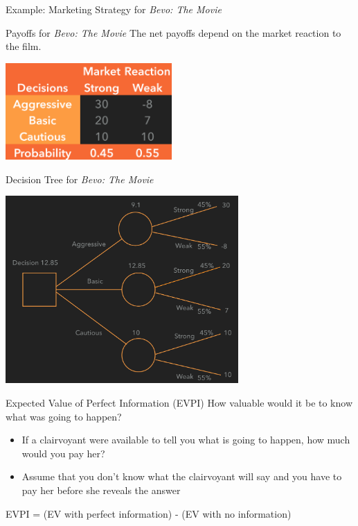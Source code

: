 \documentclass{beamer}\usepackage[]{graphicx}\usepackage[]{color}
\begin{document}
\begin{darkframes}
\begin{frame}[fragile]{Example: Marketing Strategy for \emph{Bevo: The Movie}}
    \end{frame}



    \begin{frame}[fragile]{Payoffs for \emph{Bevo: The Movie}}
      The net payoffs depend on the market reaction to the film.

        \begin{center}
          \includegraphics[width=2.5in]{BevoPayoffs} 
        \end{center}
  
    \end{frame}


    \begin{frame}[fragile]{Decision Tree for \emph{Bevo: The Movie}}

        \begin{center}
          \includegraphics[width=3.5in]{BevoDecisionTree} 
        \end{center}

      \lc %
    \end{frame}


    \begin{frame}[fragile]{Expected Value of Perfect Information (EVPI)}
        How valuable would it be to know what was going to happen?
          \begin{itemize} [<+->]
            \item If a clairvoyant were available to tell you what is going to happen, how much would you pay her?
            \item Assume that you don't know what the clairvoyant will say and you have to pay her before she reveals the answer
          \end{itemize}  
          \pause
          EVPI = (EV with perfect information) - (EV with no information)
    \end{frame}



\end{darkframes}
\end{document}
